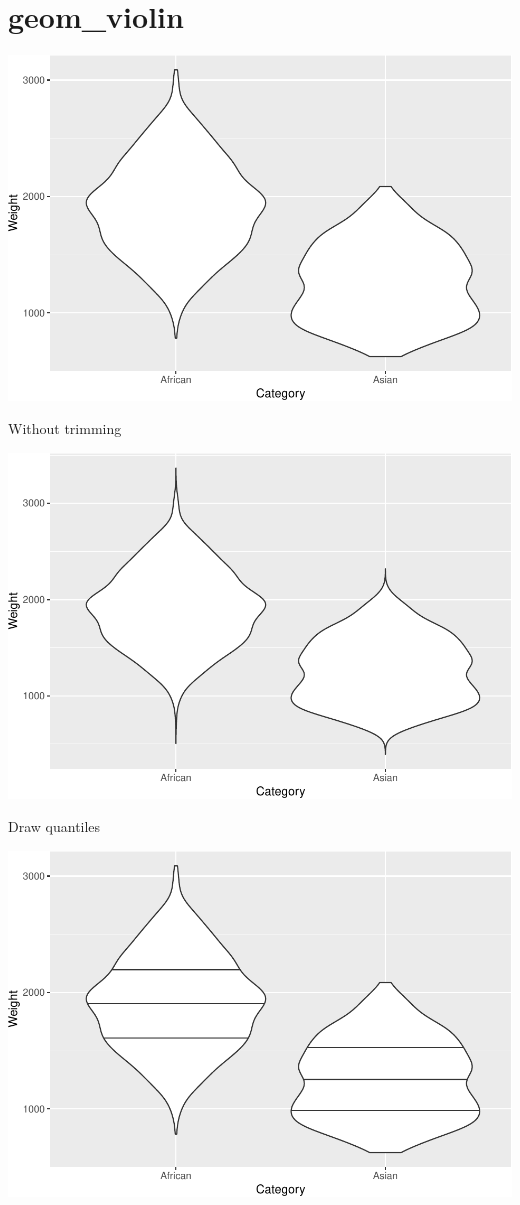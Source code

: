 \documentclass[
]{book}
\begin{document}
\hypertarget{geom_violin}{%
\section{geom\_violin}\label{geom_violin}}

\includegraphics{Data-Visualisation-geom-Encyclopedia_files/figure-latex/unnamed-chunk-51-1.pdf}

Without trimming

\includegraphics{Data-Visualisation-geom-Encyclopedia_files/figure-latex/unnamed-chunk-52-1.pdf}

Draw quantiles

\includegraphics{Data-Visualisation-geom-Encyclopedia_files/figure-latex/unnamed-chunk-53-1.pdf}
\end{document}

